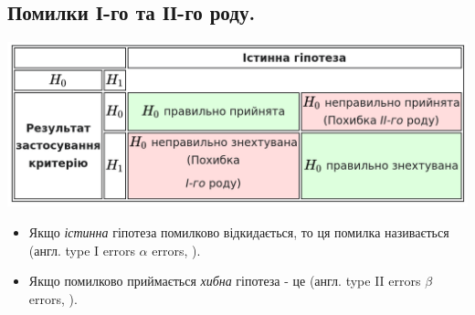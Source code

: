 \subsection{Помилки І-го та ІІ-го роду.}
\begin{center}
\vspace*{2em}
 \includegraphics[scale=0.3]{assets/lectures_part_6-4c5b9490.png}
\end{center}
\vspace*{1em}
\begin{itemize}
  \item Якщо \textit{істинна} гіпотеза помилково відкидається, то ця помилка називається  (англ. type I errors $\alpha$ errors, ).
  \item Якщо помилково приймається \textit{хибна} гіпотеза - це  (англ. type II errors $\beta$ errors, ).
\end{itemize}
